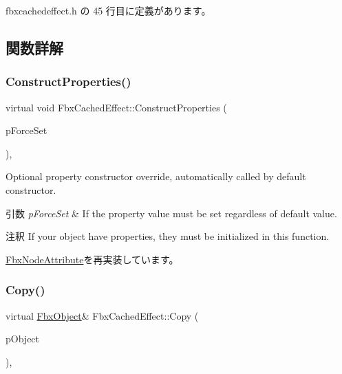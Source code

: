  fbxcachedeffect.\+h の 45 行目に定義があります。



\subsection{関数詳解}
\mbox{\label{class_fbx_cached_effect_a0a33b753735747046809b241eadb19d2}} 
\subsubsection{\texorpdfstring{Construct\+Properties()}{ConstructProperties()}}
{\footnotesize\ttfamily virtual void Fbx\+Cached\+Effect\+::\+Construct\+Properties (\begin{DoxyParamCaption}\item[{bool}]{p\+Force\+Set }\end{DoxyParamCaption})\hspace{0.3cm}{\ttfamily [protected]}, {\ttfamily [virtual]}}

Optional property constructor override, automatically called by default constructor. 
\begin{DoxyParams}{引数}
{\em p\+Force\+Set} & If the property value must be set regardless of default value. \\
\hline
\end{DoxyParams}
\begin{DoxyRemark}{注釈}
If your object have properties, they must be initialized in this function. 
\end{DoxyRemark}


\hyperlink{class_fbx_node_attribute_a042eb9949a9b9634dcc5f126e82fd04a}{Fbx\+Node\+Attribute}を再実装しています。

\mbox{\label{class_fbx_cached_effect_a6e336fc1b97a28cbc5cecfc248efe451}} 
\subsubsection{\texorpdfstring{Copy()}{Copy()}}
{\footnotesize\ttfamily virtual \hyperlink{class_fbx_object}{Fbx\+Object}\& Fbx\+Cached\+Effect\+::\+Copy (\begin{DoxyParamCaption}\item[{const \hyperlink{class_fbx_object}{Fbx\+Object} \&}]{p\+Object }\end{DoxyParamCaption})\hspace{0.3cm}{\ttfamily [protected]}, {\ttfamily [virtual]}}

